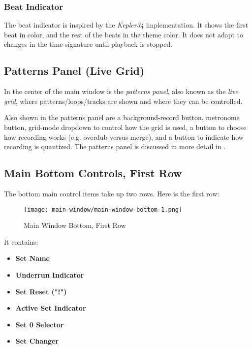 \subsubsection{Beat Indicator}
\label{subsubsec:introduction_beat_indicator}

   The beat indicator is inspired by the \textsl{Kepler34} implementation.
   It shows the first beat in color, and the rest of the beats in the theme
   color.
   It does not adapt to changes in the time-signature until
   playback is stopped.

\subsection{Patterns Panel (Live Grid)}
\label{subsec:introduction_main_live_grid}

   In the center of the main window is the \textsl{patterns panel}, also 
   known as the \textsl{live grid}, where patterns/loops/tracks are shown
   and where they can be controlled.

   Also shown in the patterns panel are a
   background-record button,
   metronome button, 
   grid-mode dropdown to control how the grid is used,
   a button to choose how recording works (e.g. overdub versus merge), and
   a button to indicate how recording is quantized.
   The patterns panel is discussed in more detail in
   .

\subsection{Main Bottom Controls, First Row}
\label{subsec:introduction_main_bottom_controls}

   The bottom main control items take up two rows.
   Here is the first row:

\begin{figure}[H]
   \centering 
   \texttt{[image: main-window/main-window-bottom-1.png]}
   \caption{Main Window Bottom, First Row}
   \label{fig:main_window_bottom_1}
\end{figure}

   It contains:

   \begin{itemize}
      \item \textbf{Set Name}
      \item \textbf{Underrun Indicator}
      \item \textbf{Set Reset ("!")}
      \item \textbf{Active Set Indicator}
      \item \textbf{Set 0 Selector}
      \item \textbf{Set Changer}
   \end{itemize}

